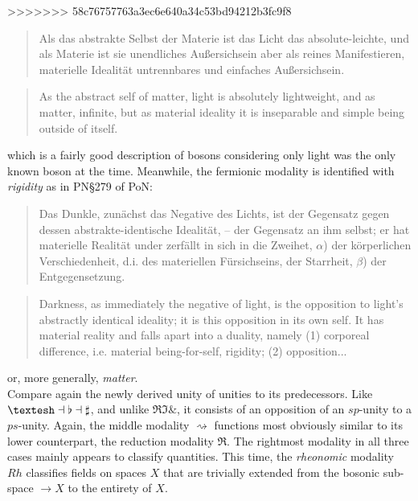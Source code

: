 \documentclass{article}
\begin{document}
>>>>>>> 58c76757763a3ec6e640a34c53bd94212b3fc9f8

\begin{quote}
    Als das abstrakte Selbst der Materie ist das Licht das absolute-leichte, und als Materie ist sie unendliches
Außersichsein aber als reines Manifestieren, materielle Idealität untrennbares und einfaches Außersichsein.

\end{quote}

\begin{quote}
    As the abstract self of matter, light is absolutely lightweight, and as matter, infinite, but as material
ideality it is inseparable and simple being outside of itself. 
\end{quote}

which is a fairly good description of bosons considering only light was the only known boson at the time.
Meanwhile, the fermionic modality is identified with \emph{rigidity} as in PN§279 of PoN:

\begin{quote}
    Das Dunkle, zunächst das Negative des Lichts, ist der Gegensatz gegen dessen abstrakte-identische
Idealität, – der Gegensatz an ihm selbst; er hat materielle Realität under zerfällt in sich in die Zweihet,
$\alpha$) der körperlichen Verschiedenheit, d.i. des materiellen Fürsichseins, der Starrheit, $\beta$)
der Entgegensetzung.
\end{quote}

\begin{quote}
    Darkness, as immediately the negative of light, is the opposition to light’s abstractly identical
ideality; it is this opposition in its own self. It has material reality and falls apart into a duality,
namely (1) corporeal difference, i.e. material being-for-self, rigidity; (2) opposition...
\end{quote}

or, more generally, \emph{matter}. \\

Compare again the newly derived unity of unities to its predecessors. Like
$\textrm{\textesh}\dashv\flat\dashv\sharp$, and unlike $\Re\Im\&$, it consists of an opposition of an
$sp$-unity to a $ps$-unity. Again, the middle modality $\rightsquigarrow$ functions most obviously similar to
its lower counterpart, the reduction modality $\Re$. The rightmost modality in all three cases mainly appears
to classify quantities. This time, the \emph{rheonomic} modality $Rh$ classifies fields on spaces $X$ that
are trivially extended from the bosonic sub-space $\rightarrow X$ to the entirety of $X$. 
\end{document}
